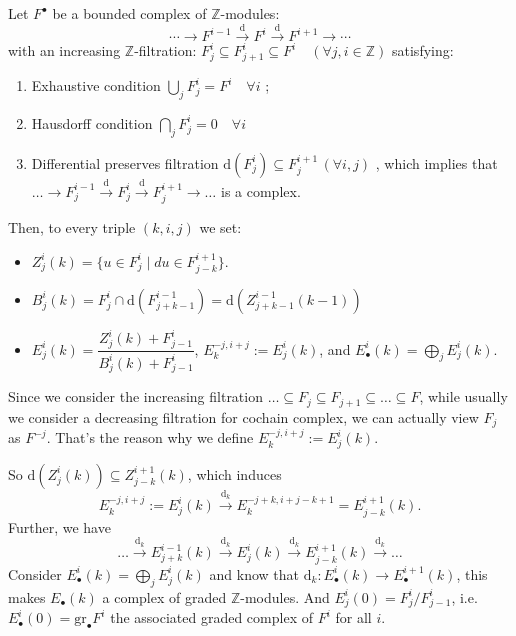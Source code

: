 Let $F^{\bullet}$ be a bounded complex of $\mathbb{Z}$-modules:$$\cdots \to F^{i-1} \xrightarrow{\mathrm{d}} F^i \xrightarrow{\mathrm{d}} F^{i+1} \to \cdots$$with an increasing $\mathbb{Z}$-filtration: $F_j^i \subseteq F_{j+1}^i \subseteq F^i \quad (\forall j,i \in \mathbb{Z})$ satisfying:
\begin{enumerate}
    \item Exhaustive condition $\bigcup\limits_j F_j^i = F^i \quad \forall i$ ;
    \item Hausdorff condition $\bigcap_j F_j^i = 0 \quad \forall i$
    \item  Differential preserves filtration $\mathrm{d}(F_j^i) \subseteq F_j^{i+1} \, (\forall i,j)$ , which implies that $\dots\rightarrow F_{j}^{i-1}\xrightarrow{\mathrm{d}} F_{j}^{i}\xrightarrow{\mathrm{d}} F_{j}^{i+1}\rightarrow\dots$ is a complex.
\end{enumerate}
Then, to every triple $(k, i, j)$ we set:
\begin{itemize}
    \item $Z_j^i(k) = \{u \in F_j^i \mid du \in F^{i+1}_{j-k}\}.$
    \item $B^{i}_{j}(k)=F^{i}_{j}\cap \mathrm{d}(F^{i-1}_{j+k-1})=\mathrm{d}(Z^{i-1}_{j+k-1}(k-1))$
    \item $E_j^i(k) = \dfrac{Z_j^i(k) + F_{j-1}^i}{B_j^i(k) + F_{j-1}^i}$, $E_{k}^{-j,i+j}:=E_{j}^{i}(k)$, and $E_{\bullet}^i(k) = \bigoplus\limits_{j} E_j^i(k)$.
\end{itemize}

\begin{remark}
    Since we consider the increasing filtration $\dots\subseteq F_{j}\subseteq F_{j+1}\subseteq \dots \subseteq F$, while usually we consider a decreasing filtration for cochain complex, we can actually view $F_{j}$ as $F^{-j}$. That's the reason why we define $E_{k}^{-j,i+j}:=E_{j}^{i}(k)$.
\end{remark}
So $\mathrm{d}(Z_j^i(k)) \subseteq Z_{j-k}^{i+1}(k)$, which induces $$ E_k^{-j,i+j} := E_j^i(k) \xrightarrow{\mathrm{d}_{k}} E_k^{-j+k,i+j-k+1} = E_{j-k}^{i+1}(k) .$$Further, we have $$\dots\xrightarrow{\mathrm{d}_{k}}E_{j+k}^{i-1}(k)\xrightarrow{\mathrm{d}_{k}}E_{j}^{i}(k)\xrightarrow{\mathrm{d}_{k}}E_{j-k}^{i+1}(k)\xrightarrow{\mathrm{d}_{k}} \dots$$Consider $E^{i}_{\bullet}(k)=\bigoplus\limits_{j}E^{i}_{j}(k)$ and know that $\mathrm{d}_{k}:E^{i}_{\bullet}(k)\rightarrow E^{i+1}_{\bullet}(k)$, this makes $E_\bullet(k)$ a complex of graded $\mathbb{Z}$-modules.  And $E_{j}^{i}(0) = F^{i}_{j} /F_{j-1}^{i}$, i.e. $E^{i}_{\bullet}(0)=\mathrm{gr }_{\bullet}  F^{i}$ the associated graded complex of  $F^{i}$ for all $i$.

